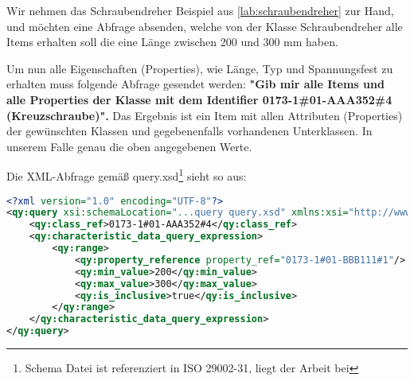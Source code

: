 Wir nehmen das Schraubendreher Beispiel aus \autoref{lab:schraubendreher} zur Hand, und möchten eine Abfrage absenden, welche von der Klasse Schraubendreher alle Items erhalten soll die eine Länge zwischen 200 und 300 mm haben. 

Um nun alle Eigenschaften (Properties), wie Länge, Typ und Spannungsfest zu erhalten muss folgende Abfrage gesendet werden: 
\textbf{"Gib mir alle Items und alle Properties der Klasse mit dem Identifier 0173-1\#01-AAA352\#4 (Kreuzschraube)".}
Das Ergebnis ist ein Item mit allen Attributen (Properties) der gewünschten Klassen und gegebenenfalls vorhandenen Unterklassen. In unserem Falle genau die oben angegebenen Werte.

Die XML-Abfrage gemäß query.xsd\footnote{Schema Datei ist referenziert in ISO 29002-31, liegt der Arbeit bei} sieht so aus:

\begin{lstlisting}[caption=Query Beispiel - Daten abfragen, language=XML, label=UseCaseDatenabfragen]
<?xml version="1.0" encoding="UTF-8"?>
<qy:query xsi:schemaLocation="...query query.xsd" xmlns:xsi="http://www.w3.org/2001/XMLSchema-instance" xmlns:cat="...catalogue" xmlns:val="...value" xmlns:qy="...query" xmlns:bas="...basic">
	<qy:class_ref>0173-1#01-AAA352#4</qy:class_ref>
	<qy:characteristic_data_query_expression>
		<qy:range>
			<qy:property_reference property_ref="0173-1#01-BBB111#1"/>
			<qy:min_value>200</qy:min_value>
			<qy:max_value>300</qy:max_value>
			<qy:is_inclusive>true</qy:is_inclusive>
		</qy:range>
	</qy:characteristic_data_query_expression>
</qy:query>
\end{lstlisting}



